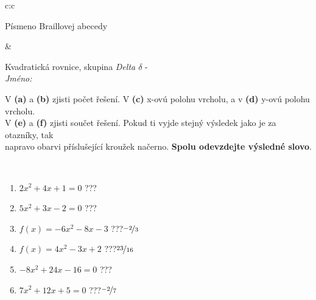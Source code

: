 \documentclass[10pt]{report}
\begin{document}
\begin{tabular}{c:c}
\begin{minipage}[c][104.5mm][t]{0.5\linewidth}
\begin{center}
\begin{minipage}{0.20\linewidth}
\begin{center}
{\small Písmeno Braillovej abecedy}
\end{center}
\end{minipage}
\end{center}
\end{minipage}
&
\begin{minipage}[c][104.5mm][t]{0.5\linewidth}
\begin{center}
\vspace{7mm}
{\huge Kvadratická rovnice, skupina \textit{Delta $\delta$} -}\\[5mm]
\textit{Jméno:}\phantom{xxxxxxxxxxxxxxxxxxxxxxxxxxxxxxxxxxxxxxxxxxxxxxxxxxxxxxxxxxxxxxxxx}\\[5mm]
\begin{minipage}{0.95\linewidth}
\begin{center}
V \textbf{(a)} a \textbf{(b)} zjisti počet řešení. V \textbf{(c)} x-ovú polohu vrcholu, a v \textbf{(d)} y-ovú polohu vrcholu.\\V \textbf{(e)} a \textbf{(f)} zjisti součet řešení. Pokud ti vyjde stejný výsledek jako je za otazníky, tak\\napravo obarvi příslušející kroužek načerno. \textbf{Spolu odevzdejte výsledné slovo}.
\end{center}
\end{minipage}
\\[1mm]
\begin{minipage}{0.79\linewidth}
\begin{center}
\begin{varwidth}{\linewidth}
\begin{enumerate}
\Large
\item $2x^2+4x+1=0$\quad \dotfill\; ???\;\dotfill {}
\item $5x^2+3x-2=0$\quad \dotfill\; ???\;\dotfill {}
\item $f(x)=-6x^2-8x-3$\quad \dotfill\; ???\;\dotfill \quad $\nicefrac{-2}{3}$
\item $f(x)=4x^2-3x+2$\quad \dotfill\; ???\;\dotfill \quad $\nicefrac{23}{16}$
\item $-8x^2+24x-16=0$\quad \dotfill\; ???\;\dotfill {}
\item $7x^2+12x+5=0$\quad \dotfill\; ???\;\dotfill \quad $\nicefrac{-2}{7}$
\end{enumerate}
\end{varwidth}
\end{center}
\end{minipage}
\begin{minipage}{0.20\linewidth}

\end{minipage}
\end{center}
\end{minipage}
\end{tabular}
\end{document}
